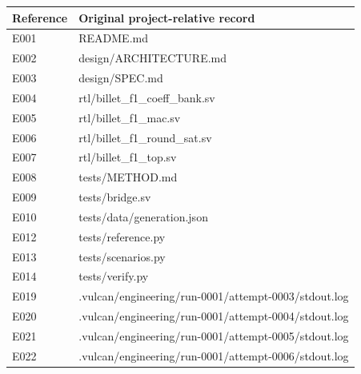\documentclass[11pt,a4paper]{article}
\begin{document}
{\small\renewcommand{\arraystretch}{1.18}\begin{longtable}{@{}L{0.12\textwidth}|L{0.82\textwidth}@{}}\toprule

\textbf{Reference} & \textbf{Original project-relative record}\\\midrule\endhead

E001 & README.md\\[2pt]\hline

E002 & design/\allowbreak{}ARCHITECTURE.md\\[2pt]\hline

E003 & design/\allowbreak{}SPEC.md\\[2pt]\hline

E004 & rtl/\allowbreak{}billet\_\allowbreak{}f1\_\allowbreak{}coeff\_\allowbreak{}bank.sv\\[2pt]\hline

E005 & rtl/\allowbreak{}billet\_\allowbreak{}f1\_\allowbreak{}mac.sv\\[2pt]\hline

E006 & rtl/\allowbreak{}billet\_\allowbreak{}f1\_\allowbreak{}round\_\allowbreak{}sat.sv\\[2pt]\hline

E007 & rtl/\allowbreak{}billet\_\allowbreak{}f1\_\allowbreak{}top.sv\\[2pt]\hline

E008 & tests/\allowbreak{}METHOD.md\\[2pt]\hline

E009 & tests/\allowbreak{}bridge.sv\\[2pt]\hline

E010 & tests/\allowbreak{}data/\allowbreak{}generation.json\\[2pt]\hline

E012 & tests/\allowbreak{}reference.py\\[2pt]\hline

E013 & tests/\allowbreak{}scenarios.py\\[2pt]\hline

E014 & tests/\allowbreak{}verify.py\\[2pt]\hline

E019 & .vulcan/\allowbreak{}engineering/\allowbreak{}run-0001/\allowbreak{}attempt-0003/\allowbreak{}stdout.log\\[2pt]\hline

E020 & .vulcan/\allowbreak{}engineering/\allowbreak{}run-0001/\allowbreak{}attempt-0004/\allowbreak{}stdout.log\\[2pt]\hline

E021 & .vulcan/\allowbreak{}engineering/\allowbreak{}run-0001/\allowbreak{}attempt-0005/\allowbreak{}stdout.log\\[2pt]\hline

E022 & .vulcan/\allowbreak{}engineering/\allowbreak{}run-0001/\allowbreak{}attempt-0006/\allowbreak{}stdout.log\\[2pt]\hline

\bottomrule\end{longtable}}
\end{document}
